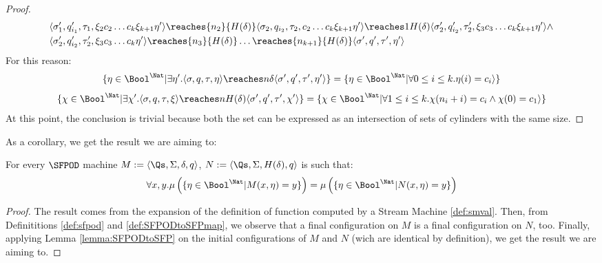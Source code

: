 \begin{proof}
\begin{align*}
     &\langle \sigma_1', q_{i_1}', \tau_1, \xi_2c_2\ldots c_k\xi_{k+1}\eta'\rangle  \reaches {n_2} {H(\delta)} \langle \sigma_2, q_{i_2}, \tau_2, c_2\ldots c_k\xi_{k+1}\eta'\rangle\reaches 1 {H(\delta)} \langle \sigma_2', q_{i_2}', \tau_2', \xi_3c_3\ldots c_k\xi_{k+1}\eta'\rangle \land \\
     &\langle \sigma_2', q_{i_2}', \tau_2', \xi_3c_3\ldots c_k\eta'\rangle \reaches {n_3} {H(\delta)} \ldots \reaches {n_{k+1}} {H(\delta)}
    \langle \sigma', q', \tau', \eta'\rangle
  \end{align*}
  \normalsize
  For this reason:
  $$
  \{\eta \in \Bool^\Nat| \exists \eta'. \langle \sigma, q, \tau, \eta\rangle\reaches n \delta \langle \sigma', q', \tau', \eta'\rangle\} = \{\eta \in \Bool^\Nat| \forall 0 \le i \le k. \eta(i) =c_i\rangle\}
  $$
  $$
  \{\chi \in \Bool^\Nat|  \exists \chi'. \langle \sigma, q, \tau, \xi\rangle\reaches n {H(\delta)} \langle \sigma', q', \tau', \chi'\rangle\} = \{\chi \in \Bool^\Nat| \forall 1 \le i \le k. \chi(n_i+i)=c_i\land \chi(0)=c_1 \rangle\}
  $$
  At this point, the conclusion is trivial because both the set can be expressed as an intersection of sets of cylinders with the same size.
\end{proof}

As a corollary, we get the result we are aiming to:

\begin{cor}
  \label{cor:SFPODtoSFP}
  For every $\SFPOD$ machine $M := \langle \Qs, \Sigma, \delta, q\rangle$,
  $N := \langle \Qs, \Sigma, H(\delta), q\rangle$ is such that:
  $$
  \forall x, y. \mu\left (\{\eta \in \Bool^\Nat | M(x, \eta)=y\}\right)
  =
  \mu\left (\{\eta \in \Bool^\Nat | N(x, \eta)=y\}\right)
  $$
\end{cor}

\begin{proof}
  The result comes from the expansion of the definition of function computed
  by a Stream Machine \ref{def:smval}.
  Then, from Definititions \ref{def:sfpod} and \ref{def:SFPODtoSFPmap},
  we observe that
  a final configuration on $M$ is a final configuration on $N$, too.
  Finally, applying Lemma \ref{lemma:SFPODtoSFP} on the initial configurations of
  $M$ and $N$ (wich are identical by definition),
  we get the result we are aiming to.
\end{proof}





































